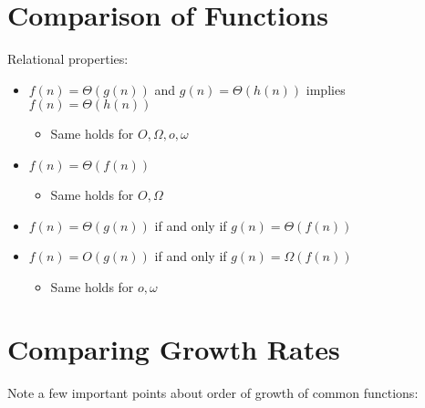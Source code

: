 \documentclass[a4paper]{report}
\newcommand{\bookref}[3]{\marginpar{\faBook{}~#1\\Chapter #2\\Section #3}}
\theoremstyle{definition}
\begin{document}
\section{Comparison of Functions}
\bookref{CLRS}{3}{3.1}
Relational properties:
\begin{itemize}
\item {} $f(n) = \Theta(g(n))$ and $g(n) = \Theta(h(n))$ implies $f(n) = \Theta(h(n))$
\begin{itemize}
\item Same holds for $O, \Omega, o, \omega$
\end{itemize}
\item {} $f(n) = \Theta(f(n))$
\begin{itemize}
\item Same holds for $O, \Omega$
\end{itemize}
\item {} $f(n) = \Theta(g(n))$ if and only if $g(n) = \Theta(f(n))$
\item {} $f(n) = O(g(n))$ if and only if $g(n) = \Omega(f(n))$
\begin{itemize}
\item Same holds for $o, \omega$
\end{itemize}
\end{itemize}


\section{Comparing Growth Rates}

Note a few important points about order of growth of common functions:
\end{document}
